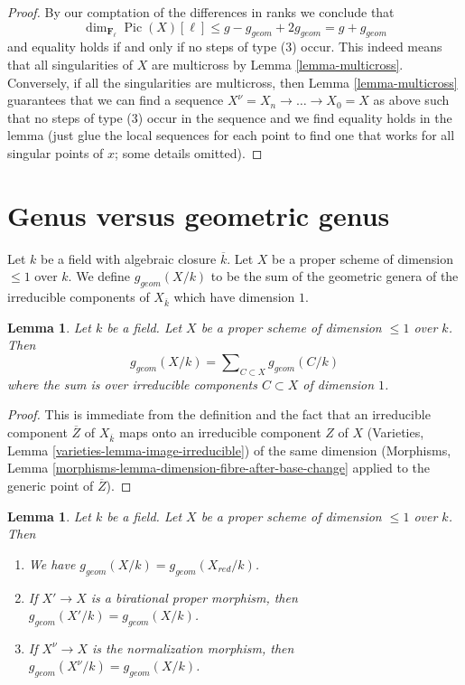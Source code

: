 \documentclass{stacks-project}
\theoremstyle{plain}
\newtheorem{lemma}[subsection]{Lemma}
\theoremstyle{definition}
\theoremstyle{remark}
\numberwithin{equation}{subsection}
\def\Pic{\mathop{\mathrm{Pic}}\nolimits}
\begin{document}
\begin{proof}
By our comptation of the differences in ranks we conclude that
$$
\dim_{\mathbf{F}_\ell} \Pic(X)[\ell] \leq
g - g_{geom} + 2g_{geom} = g + g_{geom}
$$
and equality holds if and only if no steps of type (3) occur.
This indeed means that all singularities of $X$ are multicross
by Lemma \ref{lemma-multicross}. Conversely, if all the singularities
are multicross, then Lemma \ref{lemma-multicross} guarantees that
we can find a sequence $X^\nu = X_n \to \ldots \to X_0 = X$
as above such that no steps of type (3) occur in the sequence
and we find equality holds in the lemma (just glue the local sequences
for each point to find one that works for all singular points of $x$;
some details omitted).
\end{proof}





\section{Genus versus geometric genus}
\label{section-genus-geometric-genus}

\noindent
Let $k$ be a field with algebraic closure $\overline{k}$.
Let $X$ be a proper scheme of dimension $\leq 1$ over $k$.
We define $g_{geom}(X/k)$ to be the sum of the geometric genera
of the irreducible components of $X_{\overline{k}}$ which have dimension $1$.

\begin{lemma}
\label{lemma-bound-geometric-genus}
Let $k$ be a field. Let $X$ be a proper scheme of dimension $\leq 1$ over $k$.
Then
$$
g_{geom}(X/k) = \sum\nolimits_{C \subset X} g_{geom}(C/k)
$$
where the sum is over irreducible components $C \subset X$ of dimension $1$.
\end{lemma}

\begin{proof}
This is immediate from the definition and the fact that an irreducible
component $\overline{Z}$ of $X_{\overline{k}}$ maps onto an
irreducible component $Z$ of $X$
(Varieties, Lemma \ref{varieties-lemma-image-irreducible})
of the same dimension
(Morphisms, Lemma \ref{morphisms-lemma-dimension-fibre-after-base-change}
applied to the generic point of $\overline{Z}$).
\end{proof}

\begin{lemma}
\label{lemma-geometric-genus-normalization}
Let $k$ be a field. Let $X$ be a proper scheme of dimension $\leq 1$ over $k$.
Then
\begin{enumerate}
\item We have $g_{geom}(X/k) = g_{geom}(X_{red}/k)$.
\item If $X' \to X$ is a birational proper morphism, then
$g_{geom}(X'/k) = g_{geom}(X/k)$.
\item If $X^\nu \to X$ is the normalization morphism, then
$g_{geom}(X^\nu/k) = g_{geom}(X/k)$.
\end{enumerate}
\end{lemma}
\end{document}
